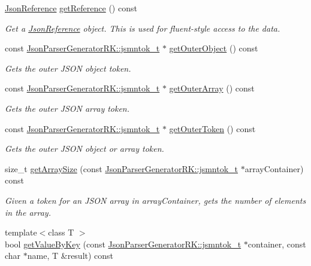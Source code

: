 \begin{DoxyCompactItemize}
\hyperlink{class_json_reference}{Json\+Reference} \hyperlink{class_json_parser_a27f639337cff7b364edb05c01f098786}{get\+Reference} () const
\begin{DoxyCompactList}\small\item\em Get a \hyperlink{class_json_reference}{Json\+Reference} object. This is used for fluent-\/style access to the data. \end{DoxyCompactList}\item 
const \hyperlink{struct_json_parser_generator_r_k_1_1jsmntok__t}{Json\+Parser\+Generator\+R\+K\+::jsmntok\+\_\+t} $\ast$ \hyperlink{class_json_parser_a4e694318a7c823d4cca3a5be49907df7}{get\+Outer\+Object} () const
\begin{DoxyCompactList}\small\item\em Gets the outer J\+S\+ON object token. \end{DoxyCompactList}\item 
const \hyperlink{struct_json_parser_generator_r_k_1_1jsmntok__t}{Json\+Parser\+Generator\+R\+K\+::jsmntok\+\_\+t} $\ast$ \hyperlink{class_json_parser_a91ffa7e1c4d2fbc2524533d65c31b605}{get\+Outer\+Array} () const
\begin{DoxyCompactList}\small\item\em Gets the outer J\+S\+ON array token. \end{DoxyCompactList}\item 
const \hyperlink{struct_json_parser_generator_r_k_1_1jsmntok__t}{Json\+Parser\+Generator\+R\+K\+::jsmntok\+\_\+t} $\ast$ \hyperlink{class_json_parser_a3c28b01c0e1fc3c7677e07e1739ea288}{get\+Outer\+Token} () const
\begin{DoxyCompactList}\small\item\em Gets the outer J\+S\+ON object or array token. \end{DoxyCompactList}\item 
size\+\_\+t \hyperlink{class_json_parser_aeb46af21c13fa2396e065543bd8db265}{get\+Array\+Size} (const \hyperlink{struct_json_parser_generator_r_k_1_1jsmntok__t}{Json\+Parser\+Generator\+R\+K\+::jsmntok\+\_\+t} $\ast$array\+Container) const
\begin{DoxyCompactList}\small\item\em Given a token for an J\+S\+ON array in array\+Container, gets the number of elements in the array. \end{DoxyCompactList}\item 
{\footnotesize template$<$class T $>$ }\\bool \hyperlink{class_json_parser_a13abcdcb2341f65ac358bb4d81007d06}{get\+Value\+By\+Key} (const \hyperlink{struct_json_parser_generator_r_k_1_1jsmntok__t}{Json\+Parser\+Generator\+R\+K\+::jsmntok\+\_\+t} $\ast$container, const char $\ast$name, T \&result) const

\end{DoxyCompactItemize}
